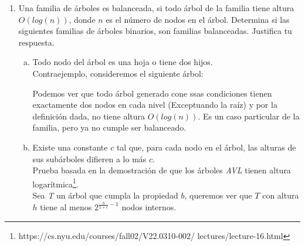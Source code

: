 \documentclass[spanish,12pt,letterpaper]{article}
\begin{document}
\begin{enumerate}
\item Una familia de árboles es balanceada, si todo árbol de la familia tiene
  altura $O(log(n))$, donde $n$ es el número de nodos en el árbol. Determina si
  las siguientes familias de árboles binarios, son familias balanceadas.
  Justifica tu respuesta.
  \begin{enumerate}[a)]
  \item Todo nodo del árbol es una hoja o tiene dos hijos.\\
    Contraejemplo, consideremos el siguiente árbol:\\
    \begin{center}
    \end{center}
    Podemos ver que todo árbol generado cone ssas condiciones tienen exactamente
    dos nodos en cada nivel (Exceptuando la raíz) y por la definición dada, no
    tiene altura $O(log(n))$. Es un caso particular de la familia, pero ya no
    cumple ser balanceado.
  \item Existe una constante $c$ tal que, para cada nodo en el árbol, las alturas
    de sus subárboles difieren a lo más $c$.\\
    Prueba basada en la demostración de que los árboles \textit{AVL} tienen
    altura logarítmica\footnote{https://cs.nyu.edu/courses/fall02/V22.0310-002/
      lectures/lecture-16.html}.\\
    Sea \textit{T} un árbol que cumpla la propiedad $b$, queremos ver que $T$ con
    altura $h$ tiene al menos $2^{\frac{h}{2+c}-1}$ nodos internos.\\

\end{enumerate}
\end{enumerate}
\end{document}
